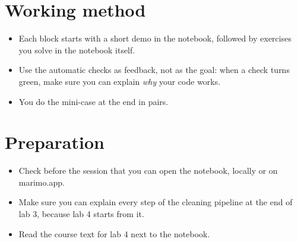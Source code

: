 \documentclass[11pt,a4paper]{article}
\begin{document}
\section{Working method}

\begin{itemize}
  \item Each block starts with a short demo in the notebook, followed by
        exercises you solve in the notebook itself.
  \item Use the automatic checks as feedback, not as the goal: when a
        check turns green, make sure you can explain \emph{why} your code
        works.
  \item You do the mini-case at the end in pairs.
\end{itemize}

\section{Preparation}

\begin{itemize}
  \item Check before the session that you can open the notebook, locally
        or on marimo.app.
  \item Make sure you can explain every step of the cleaning pipeline at
        the end of lab 3, because lab 4 starts from it.
  \item Read the course text for lab 4 next to the notebook.
\end{itemize}
\end{document}
